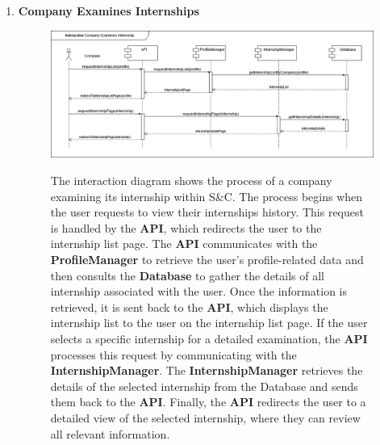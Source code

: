 \begin{enumerate}
    \newpage
    \item \textbf{Company Examines Internships}
    \begin{figure}[h!]
            \centering  \includegraphics[width=1\textwidth]{DD/Images/Interactions/INT12_CompanyExaminesInternships.drawio.png}
            \label{fig:ComponentViewDiagram}
            \caption*{The interaction diagram shows the process of a company examining its internship within S\&C. The process begins when the user requests to view their internships history. This request is handled by the \textbf{API}, which redirects the user to the internship list page. The \textbf{API} communicates with the \textbf{ProfileManager} to retrieve the user’s profile-related data and then consults the \textbf{Database} to gather the details of all internship associated with the user. 
            Once the information is retrieved, it is sent back to the \textbf{API}, which displays the internship list to the user on the internship list page.
            If the user selects a specific internship for a detailed examination, the \textbf{API} processes this request by communicating with the \textbf{InternshipManager}. The \textbf{InternshipManager} retrieves the details of the selected internship from the Database and sends them back to the \textbf{API}. Finally, the \textbf{API} redirects the user to a detailed view of the selected internship, where they can review all relevant information.
            }
    \end{figure}


\end{enumerate}
